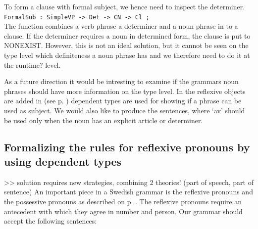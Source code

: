 \documentclass{report}
\begin{document}
To form a clause with formal subject, we hence need to inspect the determiner.
\verb|FormalSub : SimpleVP -> Det -> CN -> Cl ;|\\
The function combines a verb phrase a determiner and a noun phrase in to a clause.
If the determiner requires a noun in determined form, the clause is put to NONEXIST.
However, this is not an ideal solution, but it cannot be seen on the type level
which definiteness a noun phrase has and we therefore need to do it at the runtime? level.

As a future direction it would be intresting to examine if the grammars noun phrases
should have more information on the type level. In the reflexive objects are added in (see p.
\pageref{swe:refl}) dependent types are used for showing if a phrase can be used as
subject. We would also like to produce the sentences, where `av' should be used
only when the noun has an explicit article or determiner.
\label{sent:mosthorses}



% 
\subsection{Formalizing the rules for reflexive pronouns by using dependent types}
>> solution requires new strategies, combining 2 theories! (part of speech, part of sentence)
An important piece in a Swedish grammar is the reflexive pronouns and
the possessive pronouns as described on p. \pageref{swe:refl}.
The reflexive pronouns require an antecedent with which they agree in
number and person.
Our grammar should accept the following sentences:
\end{document}
